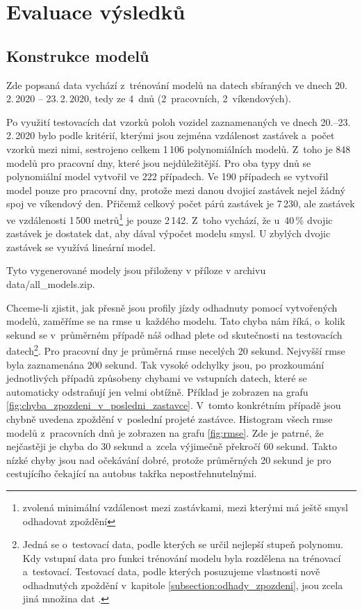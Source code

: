 \section{Evaluace výsledků}

\subsection{Konstrukce modelů}

Zde popsaná data vychází z~trénování modelů na datech sbíraných ve dnech 20.\,2.\,2020 -- 23.\,2.\,2020, tedy ze 4~dnů (2~pracovních, 2~víkendových).

\bigbreak

Po využití testovacích dat vzorků poloh vozidel zaznamenaných ve dnech 20.--23.\,2.\,2020 bylo podle kritérií, kterými jsou zejména vzdálenost zastávek a~počet vzorků mezi nimi, sestrojeno celkem 1\,106 polynomiálních modelů. Z~toho je 848 modelů pro pracovní dny, které jsou nejdůležitější. Pro oba typy dnů se polynomiální model vytvořil ve 222 případech. Ve 190 případech se vytvořil model pouze pro pracovní dny, protože mezi danou dvojicí zastávek nejel žádný spoj ve víkendový den. Přičemž celkový počet párů zastávek je 7\,230, ale zastávek ve vzdálenosti 1\,500 metrů\footnote{zvolená minimální vzdálenost mezi zastávkami, mezi kterými má ještě smysl odhadovat zpoždění} je pouze 2\,142. Z~toho vychází, že u~40\,\% dvojic zastávek je dostatek dat, aby dával výpočet modelu smysl. U zbylých dvojic zastávek se využívá lineární model.

\bigbreak

Tyto vygenerované modely jsou přiloženy v příloze v archivu data/all_models.zip.

\bigbreak

Chceme-li zjistit, jak přesně jsou profily jízdy odhadnuty pomocí vytvořených modelů, zaměříme se na \gls{rmse} u~každého modelu. Tato chyba nám říká, o~kolik sekund se v~průměrném případě náš odhad plete od skutečnosti na testovacích datech\footnote{Jedná se o~testovací data, podle kterých se určil nejlepší stupeň polynomu. Kdy vstupní data pro funkci trénování modelu byla rozdělena na trénovací a~testovací. Testovací data, podle kterých posuzujeme vlastnosti nově odhadnutých zpoždění v~kapitole \ref{subsection:odhady_zpozdeni}, jsou zcela jiná množina dat \citep[viz][Strana 365, validation set a~test set]{Ripley96}.}. Pro pracovní dny je průměrná \gls{rmse} necelých 20 sekund. Nejvyšší \gls{rmse} byla zaznamenána 200 sekund. Tak vysoké odchylky jsou, po prozkoumání jednotlivých případů způsobeny chybami ve vstupních datech, které se automaticky odstraňují jen velmi obtížně. Příklad je zobrazen na grafu \ref{fig:chyba_zpozdeni_v_posledni_zastavce}. V~tomto konkrétním případě jsou chybně uvedena zpoždění v~poslední projeté zastávce. Histogram všech \gls{rmse} modelů z~pracovních dnů je zobrazen na grafu \ref{fig:rmse}. Zde je patrné, že nejčastěji je chyba do 30 sekund a~zcela výjimečně překročí 60 sekund. Takto nízké chyby jsou nad očekávání dobré, protože průměrných 20 sekund je pro cestujícího čekající na autobus takřka nepostřehnutelnými.


